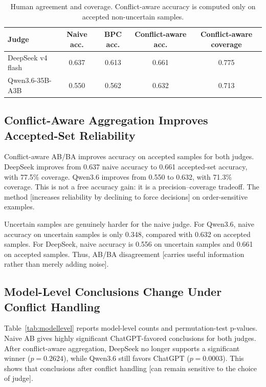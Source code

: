 \documentclass[11pt]{article}
\begin{document}
\begin{table}[h]
\centering
\begin{tabular}{lcccc}
\toprule
Judge & Naive acc. & BPC acc. & Conflict-aware acc. & Conflict-aware coverage \\
\midrule
DeepSeek v4 flash & 0.637 & 0.613 & 0.661 & 0.775 \\
Qwen3.6-35B-A3B & 0.550 & 0.562 & 0.632 & 0.713 \\
\bottomrule
\end{tabular}
\caption{Human agreement and coverage. Conflict-aware accuracy is computed only on accepted non-uncertain samples.}
\label{tab:agreement}
\end{table}

\subsection{Conflict-Aware Aggregation Improves Accepted-Set Reliability}

Conflict-aware AB/BA improves accuracy on accepted samples for both judges. DeepSeek improves from 0.637 naive accuracy to 0.661 accepted-set accuracy, with 77.5\% coverage. Qwen3.6 improves from 0.550 to 0.632, with 71.3\% coverage. This is not a free accuracy gain: it is a precision--coverage tradeoff. The method [increases reliability by declining to force decisions] on order-sensitive examples.

Uncertain samples are genuinely harder for the naive judge. For Qwen3.6, naive accuracy on uncertain samples is only 0.348, compared with 0.632 on accepted samples. For DeepSeek, naive accuracy is 0.556 on uncertain samples and 0.661 on accepted samples. Thus, AB/BA disagreement [carries useful information rather than merely adding noise].

\subsection{Model-Level Conclusions Change Under Conflict Handling}

Table~\ref{tab:modellevel} reports model-level counts and permutation-test p-values. Naive AB gives highly significant ChatGPT-favored conclusions for both judges. After conflict-aware aggregation, DeepSeek no longer supports a significant winner ($p=0.2624$), while Qwen3.6 still favors ChatGPT ($p=0.0003$). This shows that conclusions after conflict handling [can remain sensitive to the choice of judge].
\end{document}
